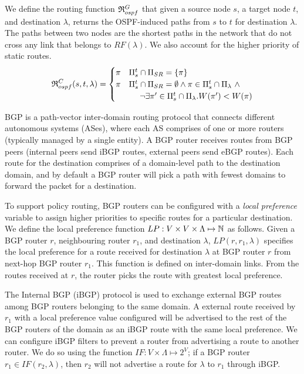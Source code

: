 We define the routing function 
$\mathfrak{R}_{ospf}^G$ 
that given 
a source node $s$,
a target node $t$,
and destination   
$\lambda$,
returns the OSPF-induced paths from $s$ to $t$ for destination   $\lambda$.
The paths between two nodes are
the shortest paths in the network
that do not cross any link that belongs to $RF(\lambda)$. We also
account for the higher priority of static routes.
\[
\mathfrak{R}_{ospf}^C(s,t,\lambda) = 
\begin{cases}
\pi  & \text{$\Pi_s^t \cap \Pi_{SR} =\{\pi\}$} \\
\pi & 
\text{$\Pi_s^t \cap \Pi_{SR} =\emptyset \wedge \pi\in \Pi_s^t\cap \Pi_\lambda ~\wedge $}  \\
& \text{~~~~$\neg\exists \pi'\in\Pi_s^t\cap \Pi_\lambda . W(\pi')< W(\pi)$} 
\end{cases}
\]

 BGP is a path-vector inter-domain routing protocol
that connects different autonomous systems (ASes), where each AS
comprises of one or more routers (typically managed by a single
entity). A BGP router receives routes from BGP peers (internal peers
send iBGP routes, external peers send eBGP routes). Each route for the
destination comprises of a domain-level path to the destination
domain, and by default a BGP router will pick a path with fewest domains 
to forward the packet for a destination.
 
To support policy routing, BGP routers can be configured with a
\emph{local preference} variable to assign higher priorities to
specific routes for a particular destination. We define the local
preference function $LP: V \times V \times \Lambda \mapsto \mathbb{N}$ as
follows.  Given a BGP router $r$, neighbouring router $r_1$, and  
destination $\lambda$, $LP(r, r_1, \lambda)$ specifies the local
preference for a route received for destination $\lambda$ at BGP
router $r$ from next-hop BGP router $r_1$.  This function is defined
on inter-domain links.  From the routes received at $r$, the router
picks the route with greatest local preference.

The Internal BGP (iBGP) protocol is used to 
exchange external BGP routes 
among BGP routers belonging
to the same domain. A external route received 
by $r_1$ with a local preference value configured 
will be advertised to the rest of the BGP routers of the 
domain as an iBGP route with the same local
preference. We can configure iBGP 
filters to prevent a router from advertising 
a route to another router. We do so using the 
function $IF: V \times \Lambda \mapsto 2^V$;
if a BGP router $r_1 \in IF(r_2, \lambda)$, then
$r_2$ will not advertise a route for $\lambda$ to
$r_1$ through iBGP. 
 
